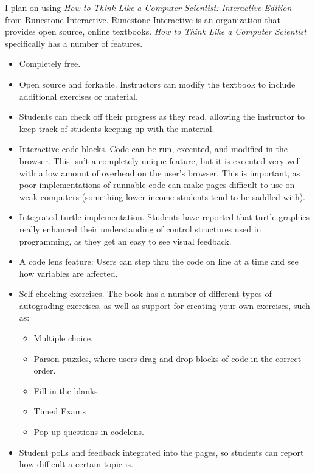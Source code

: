 \documentclass[]{article}
\begin{document}
I plan on using \href{https://runestone.academy/runestone/static/thinkcspy/index.html}{\textit{How to Think Like a Computer Scientist: Interactive Edition}} from Runestone Interactive.  
Runestone Interactive is an organization that provides open source, online textbooks.
\textit{How to Think Like a Computer Scientist} specifically has a number of features.

\begin{itemize}
	\item Completely free.
	\item Open source and forkable.  Instructors can modify the textbook to include additional exercises or material.
	\item Students can check off their progress as they read, allowing the instructor to keep track of students keeping up with the material.
	\item Interactive code blocks.  Code can be run, executed, and modified in the browser.  This isn't a completely unique feature, but it is executed very well with a low amount of overhead on the user's browser.  This is important, as poor implementations of runnable code can make pages difficult to use on weak computers (something lower-income students tend to be saddled with).
	\item Integrated turtle implementation. Students have reported that turtle graphics really enhanced their understanding of control structures used in programming, as they get an easy to see visual feedback.
	\item A code lens feature:  Users can step thru the code on line at a time and see how variables are affected.
	
	\item Self checking exercises.  The book has a number of different types of autograding exercises, as well as support for creating your own exercises, such as:
	\begin{itemize}
		\item Multiple choice.
		\item Parson puzzles, where users drag and drop blocks of code in the correct order.
		\item Fill in the blanks
		\item Timed Exams
		\item Pop-up questions in codelens.
	\end{itemize}
	
	\item Student polls and feedback integrated into the pages, so students can report how difficult a certain topic is.
\end{itemize}
\end{document}
